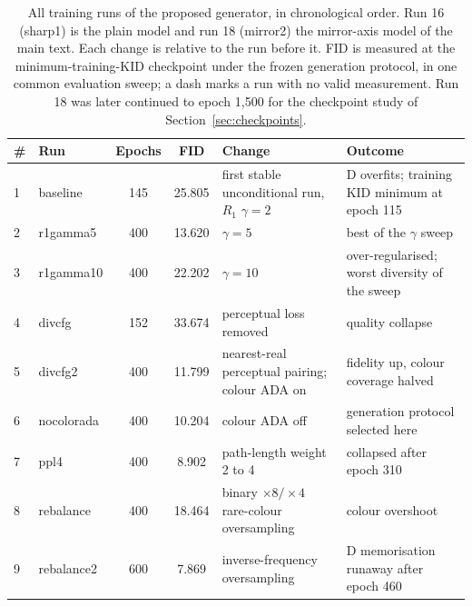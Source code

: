 \documentclass[electronics,article,submit,pdftex,moreauthors]{Definitions/mdpi}
\begin{document}
\begin{table}[H]
\caption{All training runs of the proposed generator, in chronological order. Run 16 (sharp1) is the plain model and run 18 (mirror2) the mirror-axis model of the main text. Each
change is relative to the run before it. FID is measured at the minimum-training-KID checkpoint
under the frozen generation protocol, in one common evaluation sweep; a dash
marks a run with no valid measurement. Run 18 was later continued to epoch
1,500 for the checkpoint study of Section~\ref{sec:checkpoints}.}
\label{tab:runs}
\small
\setlength{\tabcolsep}{3.5pt}
\begin{tabular}{llccll}
\toprule
\textbf{\#} & \textbf{Run} & \textbf{Epochs} & \textbf{FID} &
\textbf{Change} & \textbf{Outcome} \\
\midrule
1 & baseline & 145 & 25.805 & \parbox[t]{4.0cm}{\raggedright first stable unconditional run, $R_1$ $\gamma = 2$} & \parbox[t]{3.9cm}{\raggedright D overfits; training KID minimum at epoch 115} \\[1pt]
2 & r1gamma5 & 400 & 13.620 & \parbox[t]{4.0cm}{\raggedright $\gamma = 5$} & \parbox[t]{3.9cm}{\raggedright best of the $\gamma$ sweep} \\[1pt]
3 & r1gamma10 & 400 & 22.202 & \parbox[t]{4.0cm}{\raggedright $\gamma = 10$} & \parbox[t]{3.9cm}{\raggedright over-regularised; worst diversity of the sweep} \\[1pt]
4 & divcfg & 152 & 33.674 & \parbox[t]{4.0cm}{\raggedright perceptual loss removed} & \parbox[t]{3.9cm}{\raggedright quality collapse} \\[1pt]
5 & divcfg2 & 400 & 11.799 & \parbox[t]{4.0cm}{\raggedright nearest-real perceptual pairing; colour ADA on} & \parbox[t]{3.9cm}{\raggedright fidelity up, colour coverage halved} \\[1pt]
6 & nocolorada & 400 & 10.204 & \parbox[t]{4.0cm}{\raggedright colour ADA off} & \parbox[t]{3.9cm}{\raggedright generation protocol selected here} \\[1pt]
7 & ppl4 & 400 & 8.902 & \parbox[t]{4.0cm}{\raggedright path-length weight 2 to 4} & \parbox[t]{3.9cm}{\raggedright collapsed after epoch 310} \\[1pt]
8 & rebalance & 400 & 18.464 & \parbox[t]{4.0cm}{\raggedright binary $\times 8/\times 4$ rare-colour oversampling} & \parbox[t]{3.9cm}{\raggedright colour overshoot} \\[1pt]
9 & rebalance2 & 600 & 7.869 & \parbox[t]{4.0cm}{\raggedright inverse-frequency oversampling} & \parbox[t]{3.9cm}{\raggedright D memorisation runaway after epoch 460} \\[1pt]

\end{tabular}
\end{table}
\end{document}
